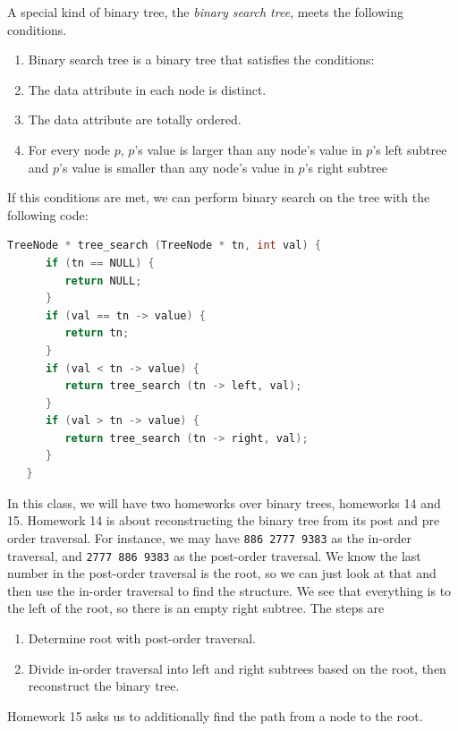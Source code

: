\documentclass[nobib]{tufte-handout}
\begin{document}
A special kind of binary tree, the \emph{binary search tree}, 
meets the following conditions. 
\begin{enumerate}
   \item Binary search tree is a binary tree that satisfies the conditions:
   \item The data attribute in each node is distinct.
   \item The data attribute are totally ordered.
   \item For every node $p$, $p$'s value is larger than any node's value in $p$'s left subtree
   and $p$'s value is smaller than any node's value in $p$'s right subtree
\end{enumerate}
If this conditions are met, 
we can perform binary search 
on the tree with the 
following code:
\begin{lstlisting}[language=C, caption={Binary search with binary tree}]
   TreeNode * tree_search (TreeNode * tn, int val) {
      if (tn == NULL) {
         return NULL;
      }
      if (val == tn -> value) {
         return tn;
      }
      if (val < tn -> value) {
         return tree_search (tn -> left, val);
      }
      if (val > tn -> value) {
         return tree_search (tn -> right, val);
      }
   }
\end{lstlisting}

In this class, we will have two homeworks over binary trees, homeworks 
14 and 15. 
Homework 14 is about reconstructing the binary tree from its post and pre
order traversal. For instance, we may have \texttt{886 2777 9383} as the in-order 
traversal, and \texttt{2777 886 9383} as the post-order traversal. We know the last number 
in the post-order traversal is the root, so we can just look at that and then use the 
in-order traversal to find the structure. We see that everything is to the left of the root, 
so there is an empty right subtree. The steps are 
\begin{enumerate}
   \item Determine root with post-order traversal. 
   \item Divide in-order traversal into left and right subtrees
   based on the root, then reconstruct the binary tree. 
\end{enumerate} 
Homework 15 asks us to additionally find the path from a node 
to the root. 
\end{document}
